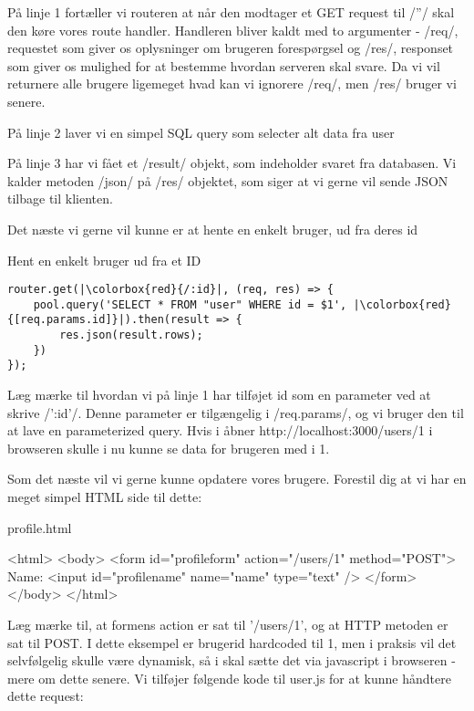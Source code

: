 \documentclass[english,course]{lecture}
\begin{document}
På linje 1 fortæller vi routeren at når den modtager et GET request til \jsinline/''/ skal den køre vores route handler. Handleren bliver kaldt med to argumenter - \jsinline/req/, requestet som giver os oplysninger om brugeren forespørgsel og \jsinline/res/, responset som giver os mulighed for at bestemme hvordan serveren skal svare. Da vi vil returnere alle brugere ligemeget hvad kan vi ignorere \jsinline/req/, men \jsinline/res/ bruger vi senere. 

På linje 2 laver vi en simpel SQL query som selecter alt data fra user

På linje 3 har vi fået et \jsinline/result/ objekt, som indeholder svaret fra databasen. Vi kalder metoden \jsinline/json/ på \jsinline/res/ objektet, som siger at vi gerne vil sende JSON tilbage til klienten.

Det næste vi gerne vil kunne er at hente en enkelt bruger, ud fra deres id

\begin{listing}[H]
\caption{Hent en enkelt bruger ud fra et ID}
\begin{verbatim}
router.get(|\colorbox{red}{/:id}|, (req, res) => {
	pool.query('SELECT * FROM "user" WHERE id = $1', |\colorbox{red}{[req.params.id]}|).then(result => {
		res.json(result.rows);
	})
});
\end{verbatim}
\end{listing}

Læg mærke til hvordan vi på linje 1 har tilføjet id som en parameter ved at skrive \jsinline/':id'/. Denne parameter er tilgængelig i \jsinline/req.params/, og vi bruger den til at lave en parameterized query. Hvis i åbner http://localhost:3000/users/1 i browseren skulle i nu kunne se data for brugeren med i 1.

Som det næste vil vi gerne kunne opdatere vores brugere. Forestil dig at vi har en meget simpel HTML side til dette:

\begin{listing}[H]
\caption{profile.html}
\label{lst:profilehtml}
\begin{htmlcode}
<html>
	<body>
		<form id="profileform" action="/users/1" method="POST">
			Name: <input id="profilename" name="name" type="text" />
		</form>
	</body>
</html>
\end{htmlcode}
\end{listing}

Læg mærke til, at formens action er sat til '/users/1', og at HTTP metoden er sat til POST. I dette eksempel er brugerid hardcoded til 1, men i praksis vil det selvfølgelig skulle være dynamisk, så i skal sætte det via javascript i browseren - mere om dette senere. Vi tilføjer følgende kode til user.js for at kunne håndtere dette request:
\end{document}
